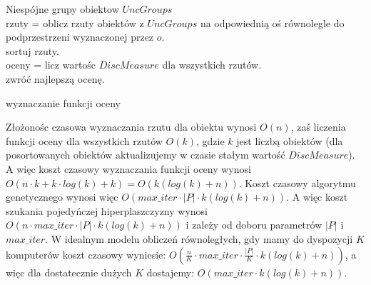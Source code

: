 \documentclass[magisterska]{pracamgr}
\theoremstyle{plain}
\theoremstyle{definition}
\theoremstyle{remark}
\begin{document}
\begin{algorithm}
	{Niespójne grupy obiektow $UncGroups$} \\
  rzuty = oblicz rzuty obiektów z $UncGroups$ na odpowiednią oś równolegle do podprzestrzeni wyznaczonej przez $o$.\\
  sortuj rzuty. \\
  oceny = licz wartośc $DiscMeasure$ dla wszystkich rzutów. \\
  zwróć najlepszą ocenę. \
  \caption{wyznaczanie funkcji oceny}
\end{algorithm}

Złożonośc czasowa wyznaczania rzutu dla obiektu wynosi $O(n)$, zaś liczenia funkcji oceny dla wszystkich rzutów $O(k)$, gdzie $k$ jest liczbą 
obiektów (dla posortowanych obiektów aktualizujemy w czasie stałym wartość $DiscMeasure$). A więc koszt czasowy wyznaczania funkcji oceny wynosi
$O(n \cdot k + k \cdot log(k) + k) = O(k(log(k) + n))$. Koszt czasowy algorytmu genetycznego wynosi więc 
$O(max\_iter \cdot |P| \cdot k(log(k) + n))$. A więc koszt szukania pojedyńczej hiperplaszczyzny wynosi 
$O(n \cdot max\_iter \cdot |P| \cdot k(log(k) + n))$ i zależy od doboru parametrów $|P|$ i $max\_iter$. W idealnym modelu obliczeń 
   równoległych, gdy mamy do dyspozycji $K$ komputerów koszt czasowy wyniesie:
$O(\frac{n}{K} \cdot max\_iter \cdot \frac{|P|}{K} \cdot k(log(k) + n))$, a więc dla dostatecznie dużych $K$ dostajemy:
$O(max\_iter \cdot k(log(k) + n))$.
   
\end{document}
